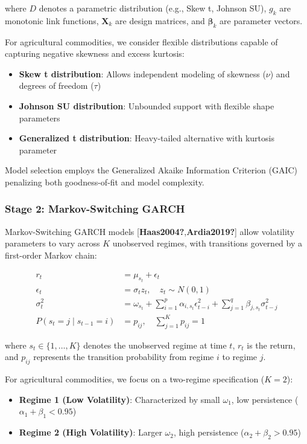\documentclass[
  10pt,
  a4paper,
]{article}
\providecommand{\tightlist}{%
  \setlength{\itemsep}{0pt}\setlength{\parskip}{0pt}}
\begin{document}
where \(D\) denotes a parametric distribution (e.g., Skew t, Johnson
SU), \(g_k\) are monotonic link functions, \(\mathbf{X}_k\) are design
matrices, and \(\boldsymbol{\beta}_k\) are parameter vectors.

For agricultural commodities, we consider flexible distributions capable
of capturing negative skewness and excess kurtosis:

\begin{itemize}
\tightlist
\item
  \textbf{Skew t distribution}: Allows independent modeling of skewness
  (\(\nu\)) and degrees of freedom (\(\tau\))
\item
  \textbf{Johnson SU distribution}: Unbounded support with flexible
  shape parameters
\item
  \textbf{Generalized t distribution}: Heavy-tailed alternative with
  kurtosis parameter
\end{itemize}

Model selection employs the Generalized Akaike Information Criterion
(GAIC) penalizing both goodness-of-fit and model complexity.

\subsubsection{Stage 2: Markov-Switching GARCH}\label{sec-msgarch}

Markov-Switching GARCH models
{[}\textbf{Haas2004?},\textbf{Ardia2019?}{]} allow volatility parameters
to vary across \(K\) unobserved regimes, with transitions governed by a
first-order Markov chain:

\[
\begin{aligned}
r_t &= \mu_{s_t} + \epsilon_t \\
\epsilon_t &= \sigma_t z_t, \quad z_t \sim N(0,1) \\
\sigma_t^2 &= \omega_{s_t} + \sum_{i=1}^{p} \alpha_{i,s_t} \epsilon_{t-i}^2 + \sum_{j=1}^{q} \beta_{j,s_t} \sigma_{t-j}^2 \\
P(s_t = j \mid s_{t-1} = i) &= p_{ij}, \quad \sum_{j=1}^{K} p_{ij} = 1
\end{aligned}
\]

where \(s_t \in \{1, \ldots, K\}\) denotes the unobserved regime at time
\(t\), \(r_t\) is the return, and \(p_{ij}\) represents the transition
probability from regime \(i\) to regime \(j\).

For agricultural commodities, we focus on a two-regime specification
(\(K=2\)):

\begin{itemize}
\tightlist
\item
  \textbf{Regime 1 (Low Volatility)}: Characterized by small
  \(\omega_1\), low persistence (\(\alpha_1 + \beta_1 < 0.95\))
\item
  \textbf{Regime 2 (High Volatility)}: Larger \(\omega_2\), high
  persistence (\(\alpha_2 + \beta_2 > 0.95\))
\end{itemize}
\end{document}
